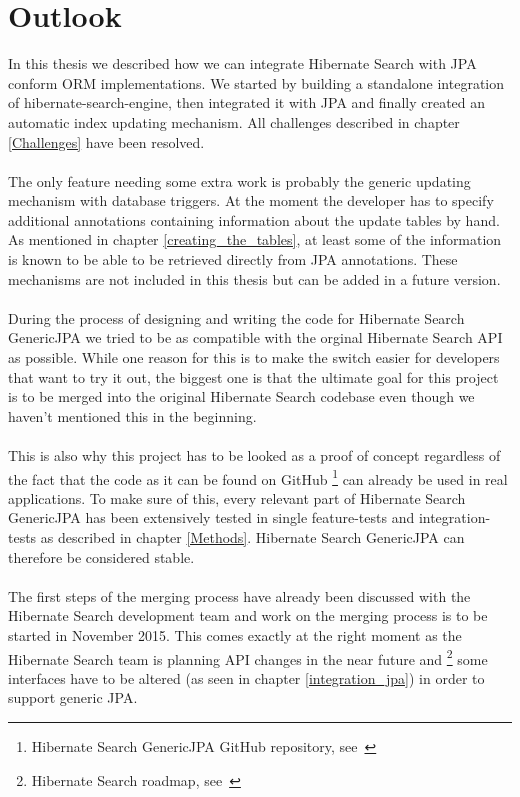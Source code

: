 
\section{Outlook}\label{outlook}

In this thesis we described how we can integrate Hibernate Search with JPA conform ORM implementations. We started by building a standalone integration of hibernate-search-engine, then integrated it with JPA and finally created an automatic index updating mechanism. All challenges described in chapter \ref{Challenges} have been resolved.
\\\\
The only feature needing some extra work is probably the generic updating mechanism with database triggers. At the moment the developer has to specify additional annotations containing information about the update tables by hand. As mentioned in chapter \ref{creating_the_tables}, at least some of the information is known to be able to be retrieved directly from JPA annotations. These mechanisms are not included in this thesis but can be added in a future version.
\\\\
During the process of designing and writing the code for Hibernate Search GenericJPA we tried to be as compatible with the orginal Hibernate Search API as possible. While one reason for this is to make the switch easier for developers that want to try it out, the biggest one is that the ultimate goal for this project is to be merged into the original Hibernate Search codebase even though we haven't mentioned this in the beginning.
\\\\
This is also why this project has to be looked as a proof of concept regardless of the fact that the code as it can be found on GitHub \footnote{Hibernate Search GenericJPA GitHub repository, see~\cite{hibernate_genericjpa_github}} can already be used in real applications. To make sure of this, every relevant part of Hibernate Search GenericJPA has been extensively tested in single feature-tests and integration-tests as described in chapter \ref{Methods}. Hibernate Search GenericJPA can therefore be considered stable. 
\\\\
The first steps of the merging process have already been discussed with the Hibernate Search development team and work on the merging process is to be started in November 2015. This comes exactly at the right moment as the Hibernate Search team is planning API changes in the near future and \footnote{Hibernate Search roadmap, see~\cite{hibernate_search_roadmap}} some interfaces have to be altered (as seen in chapter \ref{integration_jpa}) in order to support generic JPA.
